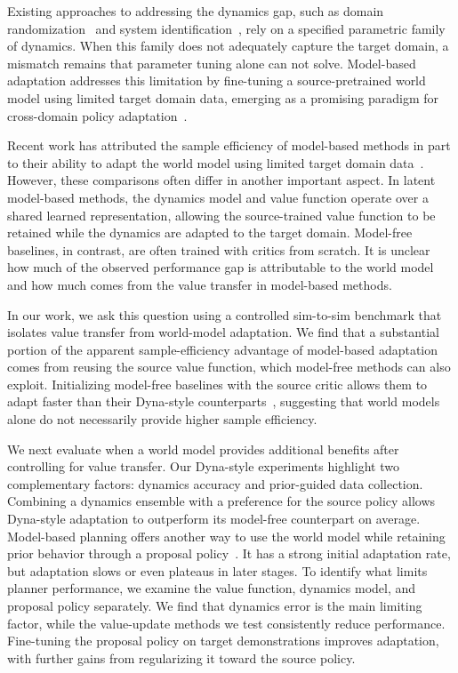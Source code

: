 \documentclass{article} %
\begin{document}
Existing approaches to addressing the dynamics gap, such as domain randomization~\citep{tobin2017domain, peng2018sim} and system identification~\citep{ramos2019bayessim, memmel2024asid}, rely on a specified parametric family of dynamics. When this family does not adequately capture the target domain, a mismatch remains that parameter tuning alone can not solve. Model-based adaptation addresses this limitation by fine-tuning a source-pretrained world model using limited target domain data, emerging as a promising paradigm for cross-domain policy adaptation~\citep{levy2026simulation}.

Recent work has attributed the sample efficiency of model-based methods in part to their ability to adapt the world model using limited target domain data~\citep{wang2021domain, levy2026simulation, lanier2026adapting, yang2026rise}. However, these comparisons often differ in another important aspect. In latent model-based methods, the dynamics model and value function operate over a shared learned representation, allowing the source-trained value function to be retained while the dynamics are adapted to the target domain. Model-free baselines, in contrast, are often trained with critics from scratch. It is unclear how much of the observed performance gap is attributable to the world model and how much comes from the value transfer in model-based methods.

In our work, we ask this question using a controlled sim-to-sim benchmark that isolates value transfer from world-model adaptation. We find that a substantial portion of the apparent sample-efficiency advantage of model-based adaptation comes from reusing the source value function, which model-free methods can also exploit. Initializing model-free baselines with the source critic allows them to adapt faster than their Dyna-style counterparts~\citep{sutton1991dyna, feinberg2018model}, suggesting that world models alone do not necessarily provide higher sample efficiency.

We next evaluate when a world model provides additional benefits after controlling for value transfer. Our Dyna-style experiments highlight two complementary factors: dynamics accuracy and prior-guided data collection. Combining a dynamics ensemble with a preference for the source policy allows Dyna-style adaptation to outperform its model-free counterpart on average. Model-based planning offers another way to use the world model while retaining prior behavior through a proposal policy~\citep{hansen2022temporal, hansen2024td}. It has a strong initial adaptation rate, but adaptation slows or even plateaus in later stages. To identify what limits planner performance, we examine the value function, dynamics model, and proposal policy separately. We find that dynamics error is the main limiting factor, while the value-update methods we test consistently reduce performance. Fine-tuning the proposal policy on target demonstrations improves adaptation, with further gains from regularizing it toward the source policy.
\end{document}
